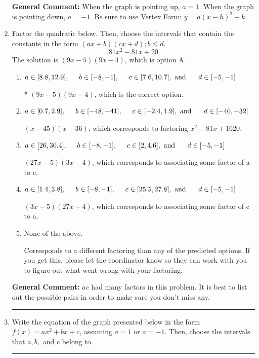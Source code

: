 \documentclass{extbook}[14pt]
\newcommand{\litem}[1]{\item #1

\rule{\textwidth}{0.4pt}}
\begin{document}
\begin{enumerate}
{\textbf{General Comment:} When the graph is pointing up, $a=1$. When the graph is pointing down, $a=-1$. Be sure to use Vertex Form: $y = a(x-h)^2+k$.
}
\litem{
Factor the quadratic below. Then, choose the intervals that contain the constants in the form $(ax+b)(cx+d); b \leq d.$
\[ 81x^{2} -81 x + 20 \]The solution is \( (9x -5)(9x -4) \), which is option A.\begin{enumerate}[label=\Alph*.]
\item \( a \in [8.8, 12.9], \hspace*{5mm} b \in [-8, -1], \hspace*{5mm} c \in [7.6, 10.7], \text{ and } \hspace*{5mm} d \in [-5, -1] \)

* $(9x -5)(9x -4)$, which is the correct option.
\item \( a \in [0.7, 2.9], \hspace*{5mm} b \in [-48, -41], \hspace*{5mm} c \in [-2.4, 1.9], \text{ and } \hspace*{5mm} d \in [-40, -32] \)

 $(x -45)(x -36)$, which corresponds to factoring $x^{2} -81 x + 1620$.
\item \( a \in [26, 30.4], \hspace*{5mm} b \in [-8, -1], \hspace*{5mm} c \in [2, 4.6], \text{ and } \hspace*{5mm} d \in [-5, -1] \)

 $(27x -5)(3x -4)$, which corresponds to associating some factor of a to c.
\item \( a \in [1.4, 3.8], \hspace*{5mm} b \in [-8, -1], \hspace*{5mm} c \in [25.5, 27.8], \text{ and } \hspace*{5mm} d \in [-5, -1] \)

 $(3x -5)(27x -4)$, which corresponds to associating some factor of c to a.
\item \( \text{None of the above.} \)

 Corresponds to a different factoring than any of the predicted options. If you get this, please let the coordinator know so they can work with you to figure out what went wrong with your factoring.
\end{enumerate}

\textbf{General Comment:} $ac$ had many factors in this problem. It is best to list out the possible pairs in order to make sure you don't miss any.
}
\litem{
Write the equation of the graph presented below in the form $f(x)=ax^2+bx+c$, assuming  $a=1$ or $a=-1$. Then, choose the intervals that $a, b,$ and $c$ belong to.

}
\end{enumerate}
\end{document}
